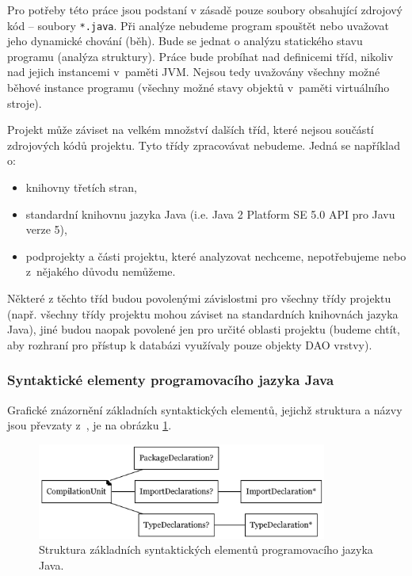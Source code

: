 Pro potřeby této práce jsou podstaní v zásadě pouze soubory obsahující zdrojový kód -- soubory \verb+*.java+. Při analýze nebudeme program spouštět nebo uvažovat jeho dynamické chování (běh). Bude se jednat o analýzu statického stavu programu (analýza struktury). Práce bude probíhat nad definicemi tříd, nikoliv nad jejich instancemi v~paměti JVM. Nejsou tedy uvažovány všechny možné běhové instance programu (všechny možné stavy objektů v~paměti virtuálního stroje).

Projekt může záviset na velkém množství dalších tříd, které nejsou součástí zdrojových kódů projektu. Tyto třídy zpracovávat nebudeme. Jedná se například o:

\begin{itemize}
\item knihovny třetích stran,
\item standardní knihovnu jazyka Java (i.e. Java 2 Platform SE 5.0 API pro Javu verze 5),
\item podprojekty a části projektu, které analyzovat nechceme, nepotřebujeme nebo z~nějakého důvodu nemůžeme.
\end{itemize}

Některé z těchto tříd budou povolenými závislostmi pro všechny třídy projektu (např. všechny třídy projektu mohou záviset na standardních knihovnách jazyka Java), jiné budou naopak povolené jen pro určité oblasti projektu (budeme chtít, aby rozhraní pro přístup k databázi využívaly pouze objekty DAO vrstvy).

\subsubsection{Syntaktické elementy programovacího jazyka Java}
\label{analysis-java_grammar_elements}

Grafické znázornění základních syntaktických elementů, jejichž struktura a názvy jsou převzaty z~\cite{Gosling:2005:JLS:1036643}, je na obrázku \ref{toplevel_elements}.

\begin{figure}[h!]
  \centering
  \includegraphics[width=0.85\textwidth]{./graphs/java_top_elements.png}
  \caption{Struktura základních syntaktických elementů programovacího jazyka Java.\label{toplevel_elements}}
\end{figure}

